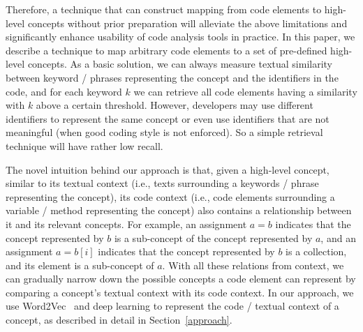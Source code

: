 Therefore, a technique that can construct mapping from code elements to high-level concepts without prior preparation will alleviate the above limitations and significantly enhance usability of code analysis tools in practice. In this paper, we describe a technique to map arbitrary code elements to a set of pre-defined high-level concepts. As a basic solution, we can always measure textual similarity between keyword / phrases representing the concept and the identifiers in the code, and for each keyword $k$ we can retrieve all code elements having a similarity with $k$ above a certain threshold. However, developers may use different identifiers to represent the same concept or even use identifiers that are not meaningful (when good coding style is not enforced). So a simple retrieval technique will have rather low recall. 

The novel intuition behind our approach is that, given a high-level concept, similar to its textual context (i.e., texts surrounding a keywords / phrase representing the concept), its code context (i.e., code elements surrounding a variable / method representing the concept) also contains a relationship between it and its relevant concepts. For example, an assignment $a = b$ indicates that the concept represented by $b$ is a sub-concept of the concept represented by $a$, and an assignment $a = b[i]$ indicates that the concept represented by $b$ is a collection, and its element is a sub-concept of $a$. With all these relations from context, we can gradually narrow down the possible concepts a code element can represent by comparing a concept's textual context with its code context. In our approach, we use Word2Vec~\cite{mikolov2013efficient} and deep learning to represent the code / textual context of a concept, as described in detail in Section~\ref{approach}.



